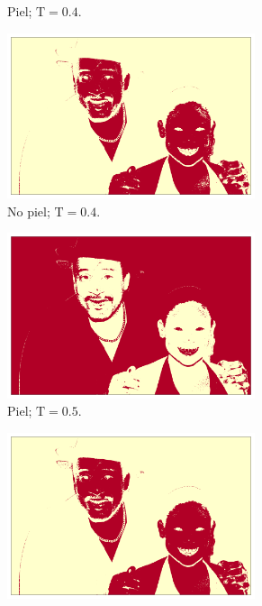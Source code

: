 \begin{figure}[ht!]
\begin{subfigure}{0.4\textwidth}
        \caption{Piel; $\text{T} = 0.4$.}
    \end{subfigure}
    \hspace{1cm}
    \begin{subfigure}{0.4\textwidth}
        \centering
        \includegraphics[width=0.8\textwidth]{../figures/image3/image_03_treshbg_40percent.png}
        \caption{No piel; $\text{T} = 0.4$.}
    \end{subfigure}
    \begin{subfigure}{0.4\textwidth}
        \centering
        \includegraphics[width=0.8\textwidth]{../figures/image3/image_03_treshskin_50percent.png}
        \caption{Piel; $\text{T} = 0.5$.}
    \end{subfigure}
    \hspace{1cm}
    \begin{subfigure}{0.4\textwidth}
        \centering
        \includegraphics[width=0.8\textwidth]{../figures/image3/image_03_treshbg_50percent.png}

\end{subfigure}
\end{figure}
